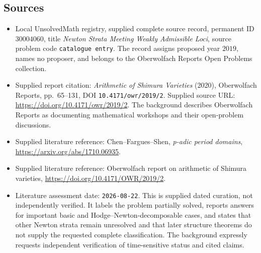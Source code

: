 \documentclass[11pt]{article}
\begin{document}
\subsection{Sources}
\begin{itemize}
\item Local UnsolvedMath registry, supplied complete source record, permanent ID \(30004060\), title \emph{Newton Strata Meeting Weakly Admissible Loci}, source problem code \texttt{catalogue entry}. The record assigns proposed year \(2019\), names no proposer, and belongs to the Oberwolfach Reports Open Problems collection.
\item Supplied report citation: \emph{Arithmetic of Shimura Varieties} (2020), Oberwolfach Reports, pp.\ 65--131, DOI \texttt{10.4171/owr/2019/2}. Supplied source URL: \url{https://doi.org/10.4171/owr/2019/2}. The background describes Oberwolfach Reports as documenting mathematical workshops and their open-problem discussions.
\item Supplied literature reference: Chen--Fargues--Shen, \emph{p-adic period domains}, \url{https://arxiv.org/abs/1710.06935}.
\item Supplied literature reference: Oberwolfach report on arithmetic of Shimura varieties, \url{https://doi.org/10.4171/OWR/2019/2}.
\item Literature assessment date: \texttt{2026-08-22}. This is supplied dated curation, not independently verified. It labels the problem partially solved, reports answers for important basic and Hodge--Newton-decomposable cases, and states that other Newton strata remain unresolved and that later structure theorems do not supply the requested complete classification. The background expressly requests independent verification of time-sensitive status and cited claims.
\end{itemize}
\end{document}
